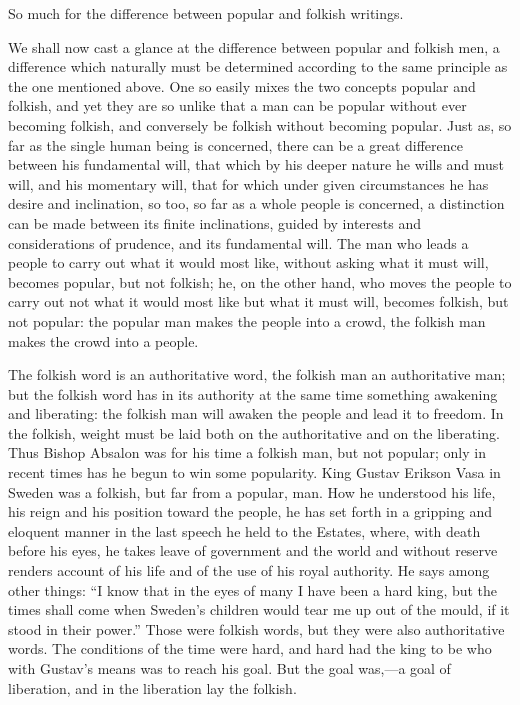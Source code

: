 \documentclass[12pt]{book}
\newcommand{\opage}[1]{\marginnote{\footnotesize\textit{[#1]}}}
\begin{document}
So much for the difference between popular and folkish writings.

We shall now cast a glance at the difference between popular and
folkish men, a difference which naturally must be determined according
to the same principle as the one mentioned above. One so easily mixes
the two concepts popular and folkish, and yet they are so unlike that a
man can be popular without ever becoming folkish, and conversely be
folkish without becoming popular. Just as, so far as the single human
being is concerned, there can be a great difference between his
fundamental will, that which by his deeper nature he wills and must
will, and his momentary will, that for which under given circumstances
he has desire and inclination, so too, so far as a whole people is
concerned, a distinction can be made between its finite inclinations,
guided by interests and considerations of prudence, and its fundamental
will. The man who leads a people to carry out what it would most like,
without asking what it must will, becomes popular, but not folkish; he,
on the other hand, who moves the people to carry out not what it would
most like but what it must will, becomes folkish, but not popular: the
popular man
\opage{129}\setcounter{footnote}{0}%
makes the people into a crowd, the folkish man makes the crowd into a
people.

The folkish word is an authoritative word, the folkish man an
authoritative man; but the folkish word has in its authority at the same
time something awakening and liberating: the folkish man will awaken the
people and lead it to freedom. In the folkish, weight must be laid both
on the authoritative and on the liberating. Thus Bishop Absalon was for
his time a folkish man, but not popular; only in recent times has he
begun to win some popularity. King Gustav Erikson Vasa in Sweden was a
folkish, but far from a popular, man. How he understood his life, his
reign and his position toward the people, he has set forth in a
gripping and eloquent manner in the last speech he held to the Estates,
where, with death before his eyes, he takes leave of government and the
world and without reserve renders account of his life and of the use of
his royal authority. He says among other things: ``I know that in the
eyes of many I have been a hard king, but the times shall come when
Sweden's children would tear me up out of the mould, if it stood in
their power.'' Those were folkish words, but they were also
authoritative words. The conditions of the time were hard, and hard had
the king to be who with Gustav's means was to reach his goal. But the
goal was,---a goal of liberation, and in the liberation lay the folkish.
\end{document}
